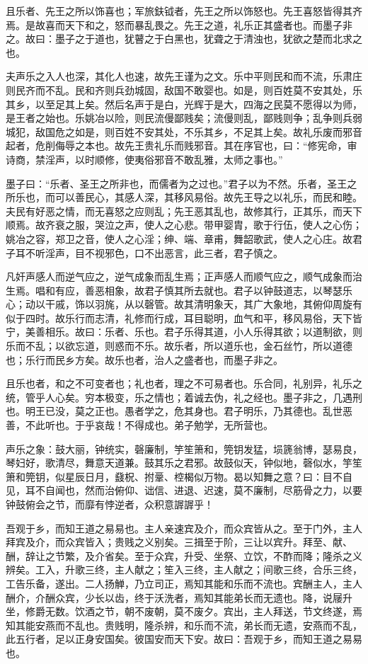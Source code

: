 \documentclass[]{article}
\begin{document}
且乐者、先王之所以饰喜也；军旅鈇钺者，先王之所以饰怒也。先王喜怒皆得其齐焉。是故喜而天下和之，怒而暴乱畏之。先王之道，礼乐正其盛者也。而墨子非之。故曰：墨子之于道也，犹瞽之于白黑也，犹聋之于清浊也，犹欲之楚而北求之也。

夫声乐之入人也深，其化人也速，故先王谨为之文。乐中平则民和而不流，乐肃庄则民齐而不乱。民和齐则兵劲城固，敌国不敢婴也。如是，则百姓莫不安其处，乐其乡，以至足其上矣。然后名声于是白，光辉于是大，四海之民莫不愿得以为师，是王者之始也。乐姚冶以险，则民流僈鄙贱矣；流僈则乱，鄙贱则争；乱争则兵弱城犯，敌国危之如是，则百姓不安其处，不乐其乡，不足其上矣。故礼乐废而邪音起者，危削侮辱之本也。故先王贵礼乐而贱邪音。其在序官也，曰：``修宪命，审诗商，禁淫声，以时顺修，使夷俗邪音不敢乱雅，太师之事也。''

墨子曰：``乐者、圣王之所非也，而儒者为之过也。''君子以为不然。乐者，圣王之所乐也，而可以善民心，其感人深，其移风易俗。故先王导之以礼乐，而民和睦。夫民有好恶之情，而无喜怒之应则乱；先王恶其乱也，故修其行，正其乐，而天下顺焉。故齐衰之服，哭泣之声，使人之心悲。带甲婴胄，歌于行伍，使人之心伤；姚冶之容，郑卫之音，使人之心淫；绅、端、章甫，舞韶歌武，使人之心庄。故君子耳不听淫声，目不视邪色，口不出恶言，此三者，君子慎之。

凡奸声感人而逆气应之，逆气成象而乱生焉；正声感人而顺气应之，顺气成象而治生焉。唱和有应，善恶相象，故君子慎其所去就也。君子以钟鼓道志，以琴瑟乐心；动以干戚，饰以羽旄，从以磬管。故其清明象天，其广大象地，其俯仰周旋有似于四时。故乐行而志清，礼修而行成，耳目聪明，血气和平，移风易俗，天下皆宁，美善相乐。故曰：乐者、乐也。君子乐得其道，小人乐得其欲；以道制欲，则乐而不乱；以欲忘道，则惑而不乐。故乐者，所以道乐也，金石丝竹，所以道德也；乐行而民乡方矣。故乐也者，治人之盛者也，而墨子非之。

且乐也者，和之不可变者也；礼也者，理之不可易者也。乐合同，礼别异，礼乐之统，管乎人心矣。穷本极变，乐之情也；着诚去伪，礼之经也。墨子非之，几遇刑也。明王已没，莫之正也。愚者学之，危其身也。君子明乐，乃其德也。乱世恶善，不此听也。于乎哀哉！不得成也。弟子勉学，无所营也。

声乐之象：鼓大丽，钟统实，磬廉制，竽笙箫和，筦钥发猛，埙篪翁博，瑟易良，琴妇好，歌清尽，舞意天道兼。鼓其乐之君邪。故鼓似天，钟似地，磬似水，竽笙箫和筦钥，似星辰日月，鼗柷、拊鞷、椌楬似万物。曷以知舞之意？曰：目不自见，耳不自闻也，然而治俯仰、诎信、进退、迟速，莫不廉制，尽筋骨之力，以要钟鼓俯会之节，而靡有悖逆者，众积意謘謘乎！

吾观于乡，而知王道之易易也。主人亲速宾及介，而众宾皆从之。至于门外，主人拜宾及介，而众宾皆入；贵贱之义别矣。三揖至于阶，三让以宾升。拜至、献、酬，辞让之节繁，及介省矣。至于众宾，升受、坐祭、立饮，不酢而降；隆杀之义辨矣。工入，升歌三终，主人献之；笙入三终，主人献之；间歌三终，合乐三终，工告乐备，遂出。二人扬觯，乃立司正，焉知其能和乐而不流也。宾酬主人，主人酬介，介酬众宾，少长以齿，终于沃洗者，焉知其能弟长而无遗也。降，说屦升坐，修爵无数。饮酒之节，朝不废朝，莫不废夕。宾出，主人拜送，节文终遂，焉知其能安燕而不乱也。贵贱明，隆杀辨，和乐而不流，弟长而无遗，安燕而不乱，此五行者，足以正身安国矣。彼国安而天下安。故曰：吾观于乡，而知王道之易易也。
\end{document}
